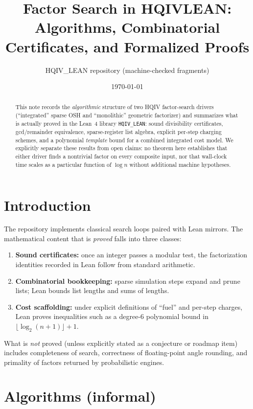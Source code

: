 \documentclass[11pt,a4paper]{article}
\title{Factor Search in HQIV\textunderscore LEAN:\\
Algorithms, Combinatorial Certificates, and Formalized Proofs}
\author{HQIV\_LEAN repository (machine-checked fragments)}
\date{\today}
\theoremstyle{plain}
\theoremstyle{definition}
\theoremstyle{remark}
\begin{document}
\maketitle

\begin{abstract}
This note records the \emph{algorithmic} structure of two HQIV factor-search drivers
(``integrated'' sparse OSH and ``monolithic'' geometric factorizer) and summarizes
what is actually proved in the Lean~4 library \texttt{HQIV\_LEAN}: sound divisibility
certificates, gcd/remainder equivalence, sparse-register list algebra, explicit
per-step charging schemes, and a polynomial \emph{template} bound for a combined
integrated cost model. We explicitly separate these results from open claims:
no theorem here establishes that either driver finds a nontrivial factor on every
composite input, nor that wall-clock time scales as a particular function of $\log n$
without additional machine hypotheses.
\end{abstract}

\tableofcontents

\section{Introduction}

The repository implements classical search loops paired with Lean mirrors. The
mathematical content that is \emph{proved} falls into three classes:
\begin{enumerate}[label=(\roman*)]
\item \textbf{Sound certificates:} once an integer passes a modular test, the
      factorization identities recorded in Lean follow from standard arithmetic.
\item \textbf{Combinatorial bookkeeping:} sparse simulation steps expand and prune
      lists; Lean bounds list lengths and sums of lengths.
\item \textbf{Cost scaffolding:} under explicit definitions of ``fuel'' and per-step
      charges, Lean proves inequalities such as a degree-$6$ polynomial bound in
      $\lfloor \log_2(n+1)\rfloor + 1$.
\end{enumerate}

What is \emph{not} proved (unless explicitly stated as a conjecture or roadmap item)
includes completeness of search, correctness of floating-point angle rounding, and
primality of factors returned by probabilistic engines.

\section{Algorithms (informal)}
\end{document}
